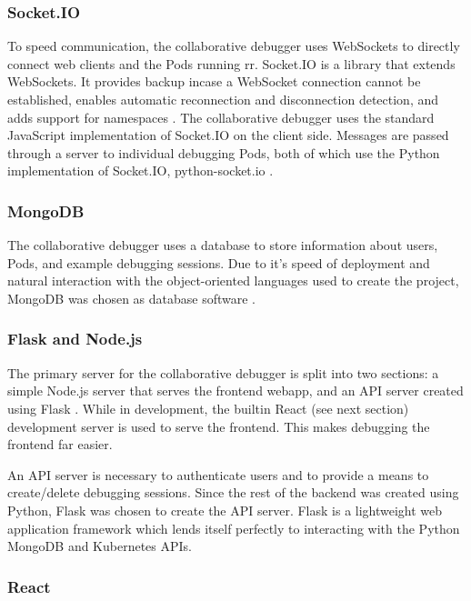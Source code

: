 \documentclass[12pt]{article}
\begin{document}
\subsubsection{Socket.IO}\label{socketio}

To speed communication, the collaborative debugger uses WebSockets to
directly connect web clients and the Pods running rr.  Socket.IO is a
library that extends WebSockets.  It provides backup incase a
WebSocket connection cannot be established, enables automatic
reconnection and disconnection detection, and adds support for
namespaces \cite{socketio}.  The collaborative debugger uses the
standard JavaScript implementation of Socket.IO on the client side.
Messages are passed through a server to individual debugging Pods,
both of which use the Python implementation of Socket.IO,
python-socket.io \cite{python_socketio}.

\subsubsection{MongoDB}\label{mongodb}

The collaborative debugger uses a database to store information about
users, Pods, and example debugging sessions.  Due to it's speed of
deployment and natural interaction with the object-oriented languages
used to create the project, MongoDB was chosen as database software
\cite{mongodb}.

\subsubsection{Flask and Node.js}\label{flask/node}

The primary server for the collaborative debugger is split into two
sections: a simple Node.js \cite{node} server that serves the frontend
webapp, and an API server created using Flask \cite{flask}.  While in
development, the builtin React (see next section) development server
is used to serve the frontend.  This makes debugging the frontend far
easier.
\par

An API server is necessary to authenticate users and to provide a
means to create/delete debugging sessions.  Since the rest of the
backend was created using Python, Flask was chosen to create the API
server.  Flask is a lightweight web application framework which lends
itself perfectly to interacting with the Python MongoDB and Kubernetes
APIs.

\subsubsection{React}\label{react}
\end{document}
